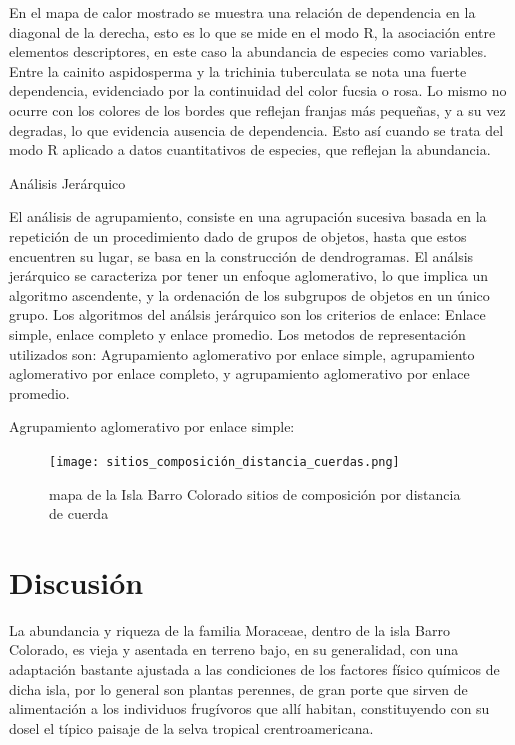 \documentclass[11pt,]{article}
\begin{document}
En el mapa de calor mostrado se muestra una relación de dependencia en
la diagonal de la derecha, esto es lo que se mide en el modo R, la
asociación entre elementos descriptores, en este caso la abundancia de
especies como variables. Entre la cainito aspidosperma y la trichinia
tuberculata se nota una fuerte dependencia, evidenciado por la
continuidad del color fucsia o rosa. Lo mismo no ocurre con los colores
de los bordes que reflejan franjas más pequeñas, y a su vez degradas, lo
que evidencia ausencia de dependencia. Esto así cuando se trata del modo
R aplicado a datos cuantitativos de especies, que reflejan la
abundancia.

Análisis Jerárquico

El análisis de agrupamiento, consiste en una agrupación sucesiva basada
en la repetición de un procedimiento dado de grupos de objetos, hasta
que estos encuentren su lugar, se basa en la construcción de
dendrogramas. El análsis jerárquico se caracteriza por tener un enfoque
aglomerativo, lo que implica un algoritmo ascendente, y la ordenación de
los subgrupos de objetos en un único grupo. Los algoritmos del análsis
jerárquico son los criterios de enlace: Enlace simple, enlace completo y
enlace promedio. Los metodos de representación utilizados son:
Agrupamiento aglomerativo por enlace simple, agrupamiento aglomerativo
por enlace completo, y agrupamiento aglomerativo por enlace promedio.

Agrupamiento aglomerativo por enlace simple:

\begin{figure}
\centering
\texttt{[image: sitios\_composición\_distancia\_cuerdas.png]}
\caption{mapa de la Isla Barro Colorado sitios de composición por
distancia de cuerda \label{fig:bci_map}}
\end{figure}

\section{Discusión}\label{discusiuxf3n}

La abundancia y riqueza de la familia Moraceae, dentro de la isla Barro
Colorado, es vieja y asentada en terreno bajo, en su generalidad, con
una adaptación bastante ajustada a las condiciones de los factores
físico químicos de dicha isla, por lo general son plantas perennes, de
gran porte que sirven de alimentación a los individuos frugívoros que
allí habitan, constituyendo con su dosel el típico paisaje de la selva
tropical crentroamericana.
\end{document}
